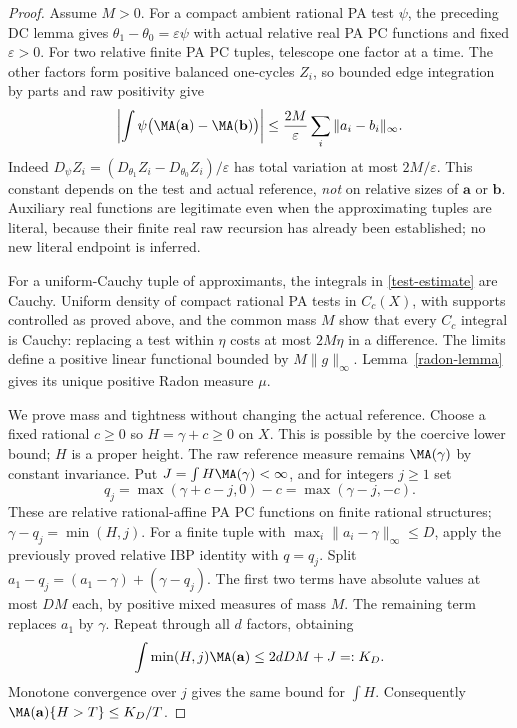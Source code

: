 \begin{proof}
Assume $M>0$. For a compact ambient rational PA test $\psi$, the preceding
DC lemma gives $\theta_1-\theta_0=\varepsilon\psi$ with actual relative
real PA PC functions and fixed $\varepsilon>0$. For two relative finite
PA PC tuples, telescope one factor at a time. The other factors form
positive balanced one-cycles $Z_i$, so bounded edge integration by parts
and raw positivity give
\begin{equation}\label{test-estimate}
 \left|\int\psi\bigl(\MA(\mathbf a)-\MA(\mathbf b)\bigr)\right|
 \leq \frac{2M}{\varepsilon}\sum_i\|a_i-b_i\|_\infty.
\end{equation}
Indeed $D_\psi Z_i=(D_{\theta_1}Z_i-D_{\theta_0}Z_i)/\varepsilon$
has total variation at most $2M/\varepsilon$. This constant depends on
the test and actual reference, \emph{not} on relative sizes of $\mathbf a$
or $\mathbf b$. Auxiliary real functions are legitimate even when the
approximating tuples are literal, because their finite real raw recursion
has already been established; no new literal endpoint is inferred.

For a uniform-Cauchy tuple of approximants, the integrals in
\eqref{test-estimate} are Cauchy. Uniform density of compact rational PA
tests in $C_c(X)$, with supports controlled as proved above, and the
common mass $M$ show that every $C_c$ integral is Cauchy: replacing a test
within $\eta$ costs at most $2M\eta$ in a difference. The limits define
a positive linear functional bounded by $M\|g\|_\infty$.
Lemma~\ref{radon-lemma} gives its unique positive Radon measure $\mu$.

We prove mass and tightness without changing the actual reference.
Choose a fixed rational $c\geq0$ so $H=\gamma+c\geq0$ on $X$.
This is possible by the coercive lower bound; $H$ is a proper height.
The raw reference measure remains $\MA(\gamma)$ by constant invariance.
Put $J=\int H\MA(\gamma)<\infty$, and for integers $j\geq1$ set
\[
 q_j=\max(\gamma+c-j,0)-c=\max(\gamma-j,-c).
\]
These are relative rational-affine PA PC functions on finite rational
structures; $\gamma-q_j=\min(H,j)$.
For a finite tuple with $\max_i\|a_i-\gamma\|_\infty\leq D$,
apply the previously proved relative IBP identity with $q=q_j$.
Split $a_1-q_j=(a_1-\gamma)+(\gamma-q_j)$.
The first two terms have absolute values at most $DM$ each, by positive
mixed measures of mass $M$. The remaining term replaces $a_1$ by
$\gamma$. Repeat through all $d$ factors, obtaining
\begin{equation}\label{moment}
 \int\min(H,j)\MA(\mathbf a)\leq2dDM+J=:K_D.
\end{equation}
Monotone convergence over $j$ gives the same bound for $\int H$.
Consequently $\MA(\mathbf a)\{H>T\}\leq K_D/T$.


\end{proof}
